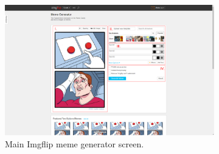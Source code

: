 \begin{figure}
    \centering
    \begin{subfigure}{\textwidth}
        \centering
        \includegraphics[width=\textwidth]{text/img/imgflip/main.png}
        \caption{Main Imgflip meme generator screen.}
        \label{fig:imgflip-main}
    \end{subfigure}
    \begin{subfigure}{0.3\textwidth}
        \centering

\end{subfigure}
\end{figure}
